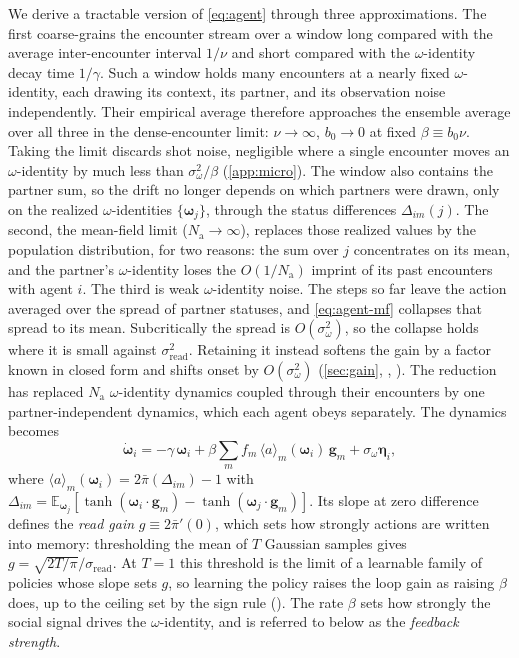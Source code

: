 \documentclass[
  aps,prx,
  reprint,
  superscriptaddress,
  nofootinbib,
  longbibliography
]{revtex4-2}
\newcommand{\w}{\bm{\omega}}
\newcommand{\g}{\mathbf{g}}
\newcommand{\sread}{\sigma_{\mathrm{read}}}
\newcommand{\sidn}{\sigma_{\omega}}
\newcommand{\pibar}{\bar\pi}
\newcommand{\gain}{g}
\newcommand{\Nag}{N_{\mathrm{a}}}
\newcommand{\smref}[1]{\cite[Sec.~#1]{SM}}
\begin{document}
We derive a tractable version of \cref{eq:agent} through three approximations. The first coarse-grains the encounter stream over a window long compared with the average inter-encounter interval $1/\nu$ and short compared with the $\omega$-identity decay time $1/\gamma$. Such a window holds many encounters at a nearly fixed $\omega$-identity, each drawing its context, its partner, and its observation noise independently. Their empirical average therefore approaches the ensemble average over all three in the dense-encounter limit: $\nu\to\infty$, $b_0\to0$ at fixed $\beta\equiv b_0\nu$. Taking the limit discards shot noise, negligible where a single encounter moves an $\omega$-identity by much less than $\sidn^2/\beta$ (\cref{app:micro}). The window also contains the partner sum, so the drift no longer depends on which partners were drawn, only on the realized $\omega$-identities $\{\w_j\}$, through the status differences $\Delta_{im}(j)$. The second, the mean-field limit ($\Nag\to\infty$), replaces those realized values by the population distribution, for two reasons: the sum over $j$ concentrates on its mean, and the partner's $\omega$-identity loses the $O(1/\Nag)$ imprint of its past encounters with agent $i$. The third is weak $\omega$-identity noise. The steps so far leave the action averaged over the spread of partner statuses, and \cref{eq:agent-mf} collapses that spread to its mean. Subcritically the spread is $O(\sidn^2)$, so the collapse holds where it is small against $\sread^2$. Retaining it instead softens the gain by a factor known in closed form and shifts onset by $O(\sidn^2)$ (\cref{sec:gain}, \smref{S6}, \smref{S8}). The reduction has replaced $\Nag$ $\omega$-identity dynamics coupled through their encounters by one partner-independent dynamics, which each agent obeys separately. The dynamics becomes
\begin{equation}
\dot{\w}_i = -\gamma\,\w_i + \beta\sum_m f_m\,\langle a\rangle_m(\w_i)\,\g_m + \sidn\bm{\eta}_i ,
\label{eq:agent-mf}
\end{equation}
where $\langle a\rangle_m(\w_i)
=2\pibar(\Delta_{im})-1$ with $\Delta_{im}=\mathbb{E}_{\w_j}\left[\tanh(\w_i\cdot\g_m)-\tanh(\w_j\cdot\g_m)\right]$. Its slope at zero difference defines the \emph{read gain} $\gain\equiv2\pibar'(0)$, which sets how strongly actions are written into memory: thresholding the mean of $T$ Gaussian samples gives $\gain=\sqrt{2T/\pi}/\sread$. At $T=1$ this threshold is the limit of a learnable family of policies whose slope sets $\gain$, so learning the policy raises the loop gain as raising $\beta$ does, up to the ceiling set by the sign rule (\smref{S1\,D}).
The rate $\beta$ sets how strongly the social signal drives the $\omega$-identity, and is referred to below as the \emph{feedback strength}.
\end{document}
